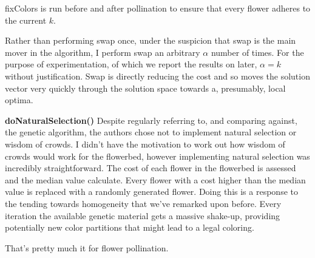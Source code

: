 fixColors is run before and after pollination to ensure that every flower adheres to the current $k$.

Rather than performing swap once, under the suspicion that swap is the main mover in the algorithm, I perform swap an arbitrary $\alpha$ number of times. For the purpose of experimentation, of which we report the results on later,  $\alpha = k$ without justification. Swap is directly reducing the cost and so moves the solution vector very quickly through the solution space towards a, presumably, local optima.

\textbf{doNaturalSelection()}
Despite regularly referring to, and comparing against, the genetic algorithm, the authors chose not to implement natural selection or wisdom of crowds. I didn't have the motivation to work out how wisdom of crowds would work for the flowerbed, however implementing natural selection was incredibly straightforward.
The cost of each flower in the flowerbed is assessed and the median value calculate. Every flower with a cost higher than the median value is replaced with a randomly generated flower.
Doing this is a response to the tending towards homogeneity that we've remarked upon before. Every iteration the available genetic material gets a massive shake-up, providing potentially new color partitions that might lead to a legal coloring.

That's pretty much it for flower pollination.










